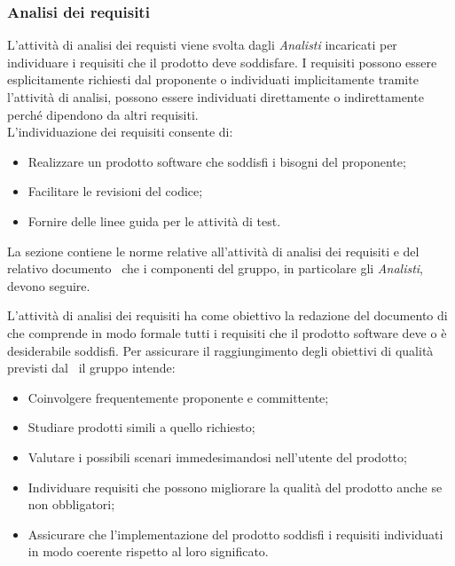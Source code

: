 \subsubsection{Analisi dei requisiti}
L'attività di analisi dei requisti viene svolta dagli \textit{Analisti} incaricati per individuare i requisiti che il prodotto deve soddisfare.
I requisiti possono essere esplicitamente richiesti dal proponente o individuati implicitamente tramite l'attività di analisi, possono essere individuati direttamente o indirettamente perché dipendono da altri requisiti.\\
L'individuazione dei requisiti consente di:
\begin{itemize}
	\item Realizzare un prodotto software che soddisfi i bisogni del proponente;
	\item Facilitare le revisioni del codice;
	\item Fornire delle linee guida per le attività di test.
\end{itemize}

La sezione contiene le norme relative all'attività di analisi dei requisiti e del relativo documento \AdR\ che i componenti del gruppo, in particolare gli \textit{Analisti}, devono seguire.

\label{AspettativeAnalisi}L'attività di analisi dei requisiti ha come obiettivo la redazione del documento di \AdR{} che comprende in modo formale tutti i requisiti che il prodotto software deve o è desiderabile soddisfi. Per assicurare il raggiungimento degli obiettivi di qualità previsti dal \PdQ\ il gruppo intende:
\begin{itemize}
	\item Coinvolgere frequentemente proponente e committente;
	\item Studiare prodotti simili a quello richiesto;
	\item Valutare i possibili scenari immedesimandosi nell'utente del prodotto;
	\item Individuare requisiti che possono migliorare la qualità del prodotto anche se non obbligatori;
	\item Assicurare che l'implementazione del prodotto soddisfi i requisiti individuati in modo coerente rispetto al loro significato.
\end{itemize}


